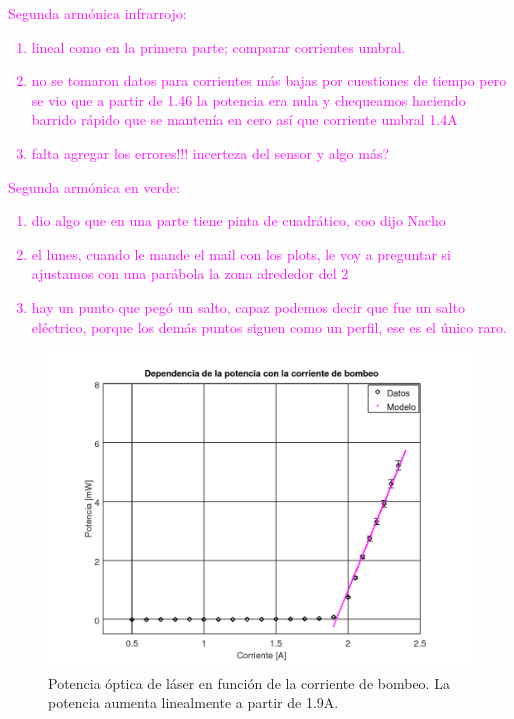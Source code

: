 \documentclass[10pt, a4paper]{article}%
\begin{document}
\begin{multicols}{2}
\textcolor{magenta}{Segunda armónica infrarrojo:
\begin{enumerate}
    \item lineal como en la primera parte; comparar corrientes umbral.
    \item no se tomaron datos para corrientes más bajas por cuestiones de tiempo pero se vio que a partir de 1.46 la potencia era nula y chequeamos haciendo barrido rápido que se mantenía en cero así que corriente umbral 1.4A
    \item falta agregar los errores!!! incerteza del sensor y algo más?
\end{enumerate}}
\textcolor{magenta}{
Segunda armónica en verde:
\begin{enumerate}
    \item dio algo que en una parte tiene pinta de cuadrático, coo dijo Nacho
    \item el lunes, cuando le mande el mail con los plots, le voy a preguntar si ajustamos con una parábola la zona alrededor del 2
    \item hay un punto que pegó un salto, capaz podemos decir que fue un salto eléctrico, porque los demás puntos siguen como un perfil, ese es el único raro.
\end{enumerate}
}







\begin{figure}[H]
    \centering
    \includegraphics[scale=0.4]{Graficos/potvscor.png}
    \caption{Potencia óptica de láser en función de la corriente de bombeo. La potencia aumenta linealmente a partir de 1.9A.}
    \label{laservscorr}
\end{figure}


\end{multicols}
\end{document}
